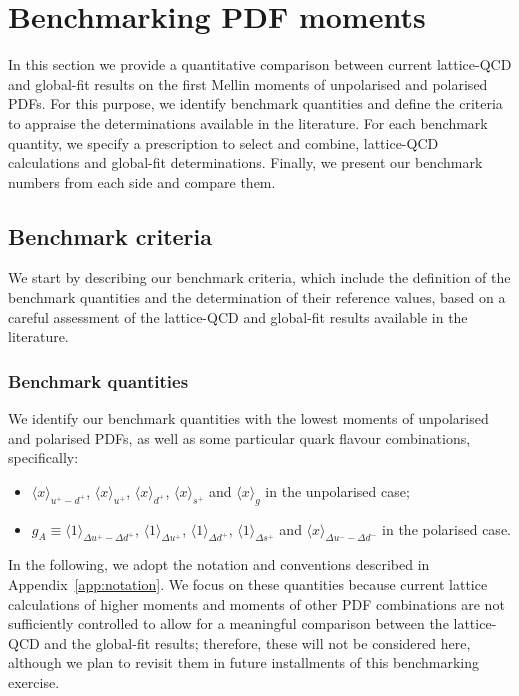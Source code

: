 \section{Benchmarking PDF moments}
\label{sec:benchmarking}

In this section we provide a quantitative comparison between 
current lattice-QCD and global-fit results on the first
Mellin moments of unpolarised and polarised PDFs.
%
For this purpose, we identify benchmark quantities
and define the criteria to appraise the determinations
available in the literature.
%
For each benchmark quantity, we specify a prescription to 
select and combine, lattice-QCD calculations and global-fit determinations.
%
Finally, we present our benchmark numbers from each side and compare them.

\subsection{Benchmark criteria}
\label{subsec:BC}

We start by describing our benchmark criteria, which include the definition
of the benchmark quantities and the determination of their reference values,
based on a careful assessment of the lattice-QCD and global-fit results 
available in the literature.

\subsubsection{Benchmark quantities}
\label{subsubsec:BQ}

We identify our benchmark quantities with the lowest moments of unpolarised 
and polarised PDFs, as well as  some particular quark
flavour combinations, specifically:
\begin{itemize}
  \item
$\langle x\rangle_{u^+-d^+}$, $\langle x \rangle_{u^+}$, $\langle x \rangle_{d^+}$, 
$\langle x \rangle_{s^+}$ and $\langle x \rangle_{g}$ in the unpolarised case; 
\item $g_A\equiv\langle 1 \rangle_{\Delta u^+ - \Delta d ^+}$, 
$\langle 1 \rangle_{\Delta u^+}$, $\langle 1 \rangle_{\Delta d^+}$,  
$\langle 1 \rangle_{\Delta s^+}$ and $\langle x \rangle_{\Delta u^- - \Delta d^-}$ 
  in the polarised case.
  \end{itemize}
%
In the following, we adopt the notation and conventions
described in Appendix~\ref{app:notation}.
%
We focus on these quantities because current lattice 
calculations of higher moments and moments of other PDF 
combinations are not sufficiently controlled to allow for a meaningful 
comparison between the lattice-QCD and the global-fit results;
therefore, these will not be considered here, although we plan to revisit
them in future installments of this benchmarking exercise.

